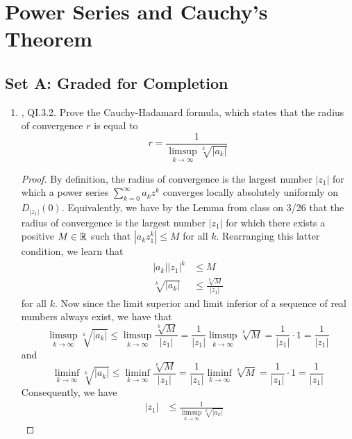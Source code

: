 \documentclass[../psets.tex]{subfiles}
\begin{document}
\section{Power Series and Cauchy's Theorem}
\subsection*{Set A: Graded for Completion}
\begin{enumerate}[ref={A.\arabic*}]
    \item {}\textcite{bib:FischerLieb}, QI.3.2. Prove the Cauchy-Hadamard formula, which states that the radius of convergence $r$ is equal to
    \begin{equation*}
        r = \frac{1}{\limsup_{k\to\infty}\sqrt[k]{|a_k|}}
    \end{equation*}
    \begin{proof}
        By definition, the radius of convergence is the largest number $|z_1|$ for which a power series $\sum_{k=0}^\infty a_kz^k$ converges locally absolutely uniformly on $D_{|z_1|}(0)$. Equivalently, we have by the Lemma from class on 3/26 that the radius of convergence is the largest number $|z_1|$ for which there exists a positive $M\in\mathbb{R}$ such that $|a_kz_1^k|\leq M$ for all $k$. Rearranging this latter condition, we learn that
        \begin{align*}
            |a_k||z_1|^k &\leq M\\
            \sqrt[k]{|a_k|} &\leq \frac{\sqrt[k]{M}}{|z_1|}
        \end{align*}
        for all $k$. Now since the limit superior and limit inferior of a sequence of real numbers always exist, we have that
        \begin{equation*}
            \limsup_{k\to\infty}\sqrt[k]{|a_k|} \leq \limsup_{k\to\infty}\frac{\sqrt[k]{M}}{|z_1|}
            = \frac{1}{|z_1|}\limsup_{k\to\infty}\sqrt[k]{M}
            = \frac{1}{|z_1|}\cdot 1
            = \frac{1}{|z_1|}
        \end{equation*}
        and
        \begin{equation*}
            \liminf_{k\to\infty}\sqrt[k]{|a_k|} \leq \liminf_{k\to\infty}\frac{\sqrt[k]{M}}{|z_1|}
            = \frac{1}{|z_1|}\liminf_{k\to\infty}\sqrt[k]{M}
            = \frac{1}{|z_1|}\cdot 1
            = \frac{1}{|z_1|}
        \end{equation*}
        Consequently, we have
        \begin{align*}
            |z_1| &\leq \frac{1}{\limsup_{k\to\infty}\sqrt[k]{|a_k|}}&

\end{align*}
\end{proof}
\end{enumerate}
\end{document}
